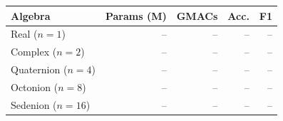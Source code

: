 \begin{tabular}{lrrrr}
\toprule
Algebra & Params (M) & GMACs & Acc. & F1 \\
\midrule
Real ($n{=}1$) & -- & -- & -- & -- \\
Complex ($n{=}2$) & -- & -- & -- & -- \\
Quaternion ($n{=}4$) & -- & -- & -- & -- \\
Octonion ($n{=}8$) & -- & -- & -- & -- \\
Sedenion ($n{=}16$) & -- & -- & -- & -- \\
\bottomrule
\end{tabular}
